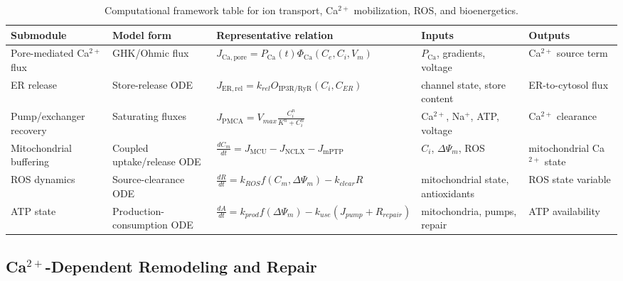 \begin{table}[t]
\footnotesize\sf
\centering
\caption{Computational framework table for ion transport, Ca$^{2+}$ mobilization, ROS, and bioenergetics.\label{T_A6_comp_ca_ros}}
\begin{tabular}{p{2.6cm} p{3.0cm} p{4.6cm} p{2.8cm} p{2.8cm}}
\toprule
\textbf{Submodule} & \textbf{Model form} & \textbf{Representative relation} & \textbf{Inputs} & \textbf{Outputs} \\
\midrule
Pore-mediated Ca$^{2+}$ flux & GHK/Ohmic flux \cite{tieleman2004molecular,tarek2005membrane} & $J_{\mathrm{Ca,pore}}=P_{\mathrm{Ca}}(t)\Phi_{\mathrm{Ca}}(C_e,C_i,V_m)$ & $P_{\mathrm{Ca}}$, gradients, voltage & Ca$^{2+}$ source term \\
ER release & Store-release ODE \cite{li1994equations,shannon2004mathematical} & $J_{\mathrm{ER,rel}}=k_{rel}O_{\mathrm{IP3R/RyR}}(C_i,C_{ER})$ & channel state, store content & ER-to-cytosol flux \\
Pump/exchanger recovery & Saturating fluxes \cite{shannon2004mathematical} & $J_{\mathrm{PMCA}}=V_{max}\frac{C_i^n}{K^n+C_i^n}$ & Ca$^{2+}$, Na$^+$, ATP, voltage & Ca$^{2+}$ clearance \\
Mitochondrial buffering & Coupled uptake/release ODE \cite{magnus1997minimal,bertram2006simplified} & $\frac{dC_m}{dt}=J_{\mathrm{MCU}}-J_{\mathrm{NCLX}}-J_{\mathrm{mPTP}}$ & $C_i$, $\Delta\Psi_m$, ROS & mitochondrial Ca$^{2+}$ state \\
ROS dynamics & Source-clearance ODE \cite{cortassa2004mitochondrial} & $\frac{dR}{dt}=k_{ROS}f(C_m,\Delta\Psi_m)-k_{clear}R$ & mitochondrial state, antioxidants & ROS state variable \\
ATP state & Production-consumption ODE \cite{beard2005biophysical,bertram2006simplified} & $\frac{dA}{dt}=k_{prod}f(\Delta\Psi_m)-k_{use}(J_{pump}+R_{repair})$ & mitochondria, pumps, repair & ATP availability \\
\bottomrule
\end{tabular}
\end{table}

\subsection*{Ca$^{2+}$-Dependent Remodeling and Repair}

